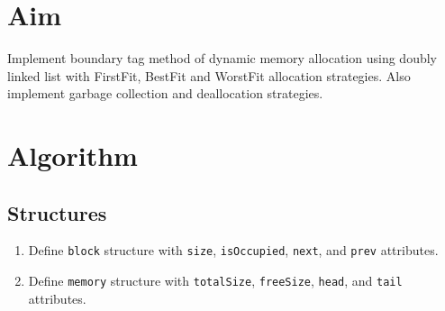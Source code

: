 
\section{Aim}
Implement boundary tag method of dynamic memory allocation using doubly linked list with FirstFit, BestFit and WorstFit allocation strategies. Also implement garbage collection and deallocation strategies.

\section{Algorithm}

 {\selectfont
  \subsection{Structures}
  \begin{enumerate}[label=\arabic*.,left=0pt]
    \item Define \texttt{block} structure with \texttt{size}, \texttt{isOccupied}, \texttt{next}, and \texttt{prev} attributes.
    \item Define \texttt{memory} structure with \texttt{totalSize}, \texttt{freeSize}, \texttt{head}, and \texttt{tail} attributes.
  \end{enumerate}

}
